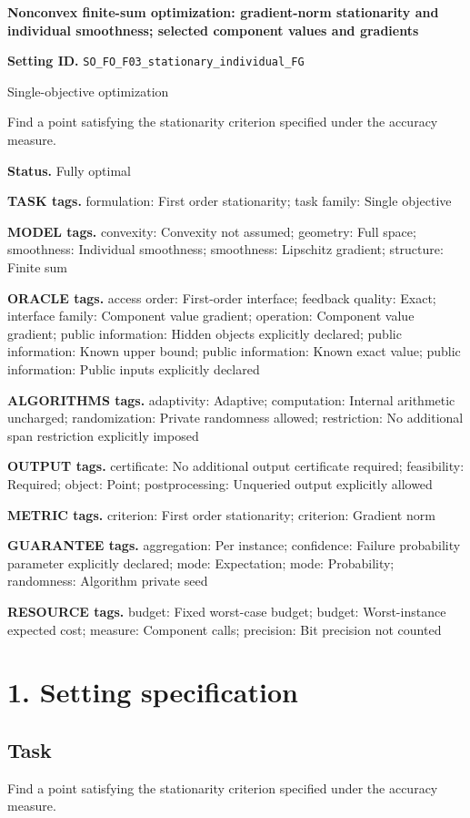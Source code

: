 \documentclass[10pt,a4paper]{article}
\begin{document}
\raggedright

{\LARGE\bfseries\sffamily\color{AtlasNavy} Nonconvex finite-sum optimization: gradient-norm stationarity and individual smoothness; selected component values and gradients\par}\vspace{5pt}
\textbf{Setting ID.} \texttt{SO\_\allowbreak{}FO\_\allowbreak{}F03\_\allowbreak{}stationary\_\allowbreak{}individual\_\allowbreak{}FG}

Single-objective optimization

Find a point satisfying the stationarity criterion specified under the accuracy measure.

\textbf{Status.} Fully optimal

\textbf{TASK tags.} formulation: First order stationarity; task family: Single objective

\textbf{MODEL tags.} convexity: Convexity not assumed; geometry: Full space; smoothness: Individual smoothness; smoothness: Lipschitz gradient; structure: Finite sum

\textbf{ORACLE tags.} access order: First-order interface; feedback quality: Exact; interface family: Component value gradient; operation: Component value gradient; public information: Hidden objects explicitly declared; public information: Known upper bound; public information: Known exact value; public information: Public inputs explicitly declared

\textbf{ALGORITHMS tags.} adaptivity: Adaptive; computation: Internal arithmetic uncharged; randomization: Private randomness allowed; restriction: No additional span restriction explicitly imposed

\textbf{OUTPUT tags.} certificate: No additional output certificate required; feasibility: Required; object: Point; postprocessing: Unqueried output explicitly allowed

\textbf{METRIC tags.} criterion: First order stationarity; criterion: Gradient norm

\textbf{GUARANTEE tags.} aggregation: Per instance; confidence: Failure probability parameter explicitly declared; mode: Expectation; mode: Probability; randomness: Algorithm private seed

\textbf{RESOURCE tags.} budget: Fixed worst-case budget; budget: Worst-instance expected cost; measure: Component calls; precision: Bit precision not counted

\section{1. Setting specification}
\subsection{Task}
Find a point satisfying the stationarity criterion specified under the accuracy measure.
\end{document}
